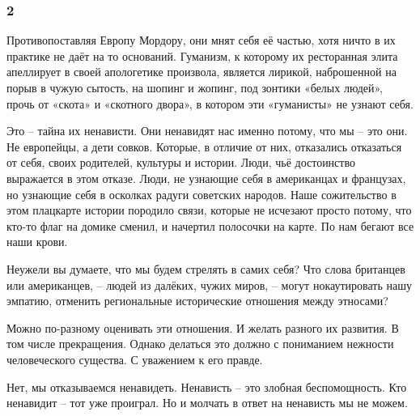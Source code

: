  
 
 
 
 

\subsubsection{2}

Противопоставляя Европу Мордору, они мнят себя её частью, хотя ничто в их
практике не даёт на то оснований. Гуманизм, к которому их ресторанная элита
апеллирует в своей апологетике произвола, является лирикой, наброшенной на
порыв в чужую сытость, на шопинг и жопинг, под зонтики «белых людей», прочь от
«скота» и «скотного двора», в котором эти «гуманисты» не узнают себя.

Это – тайна их ненависти. Они ненавидят нас именно потому, что мы – это они. Не
европейцы, а дети совков. Которые, в отличие от них, отказались отказаться от
себя, своих родителей, культуры и истории. Люди, чьё достоинство выражается в
этом отказе. Люди, не узнающие себя в американцах и французах, но узнающие себя
в осколках радуги советских народов. Наше сожительство в этом плацкарте истории
породило связи, которые не исчезают просто потому, что кто-то флаг на домике
сменил, и начертил полосочки на карте. По нам бегают все наши крови.

Неужели вы думаете, что мы будем стрелять в самих себя? Что слова британцев
или американцев, – людей из далёких, чужих миров, – могут нокаутировать нашу
эмпатию, отменить региональные исторические отношения между этносами?

Можно по-разному оценивать эти отношения. И желать разного их развития. В том
числе прекращения. Однако делаться это должно с пониманием нежности
человеческого существа. С уважением к его правде.

Нет, мы отказываемся ненавидеть. Ненависть – это злобная беспомощность. Кто
ненавидит – тот уже проиграл. Но и молчать в ответ на ненависть мы не можем.
